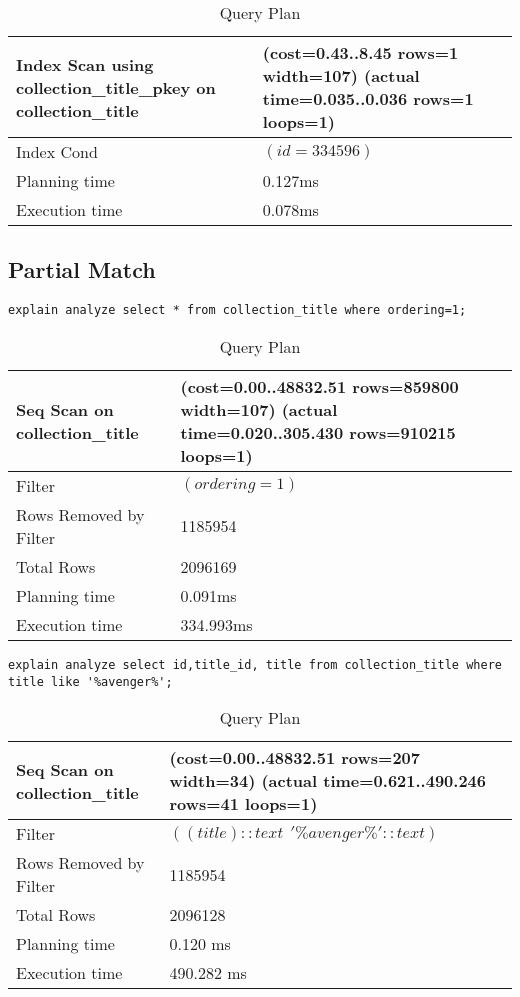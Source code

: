 \documentclass[paper=letter, fontsize=12pt]{article}
\begin{document}
\begin{longtable}{p{4cm} | p{12cm}}
	\caption{Query Plan}
	\\
	Index Scan using collection\_title\_pkey on collection\_title & (cost=0.43..8.45 rows=1 width=107) (actual time=0.035..0.036 rows=1 loops=1)
	\\ \hline
	Index Cond & $(id = 334596)$
	\\ \hline
	Planning time & 0.127ms
	\\ \hline
	Execution time & 0.078ms
\end{longtable}

\subsection{Partial Match}
\begin{verbatim}
explain analyze select * from collection_title where ordering=1;
\end{verbatim}

\begin{longtable}{p{4cm} | p{12cm}}
	\caption{Query Plan}
	\\
	Seq Scan on collection\_title & (cost=0.00..48832.51 rows=859800 width=107) (actual time=0.020..305.430 rows=910215 loops=1)
	\\ \hline
	Filter & $(ordering = 1)$
	\\ \hline
	Rows Removed by Filter & 1185954
	\\ \hline
	Total Rows & 2096169
	\\ \hline
	Planning time & 0.091ms
	\\ \hline
	Execution time & 334.993ms
\end{longtable}

\begin{verbatim}
explain analyze select id,title_id, title from collection_title where title like '%avenger%';
\end{verbatim}

\begin{longtable}{p{4cm} | p{12cm}}
	\caption{Query Plan}
	\\
	Seq Scan on collection\_title & (cost=0.00..48832.51 rows=207 width=34) (actual time=0.621..490.246 rows=41 loops=1)
	\\ \hline
	Filter & $((title)::text ~~ '\%avenger\%'::text)$
	\\ \hline
	Rows Removed by Filter & 1185954
	\\ \hline
	Total Rows & 2096128
	\\ \hline
	Planning time & 0.120 ms
	\\ \hline
	Execution time & 490.282 ms
\end{longtable}
\end{document}
